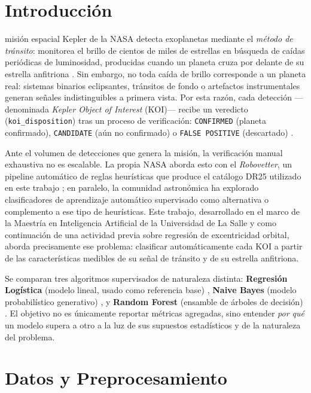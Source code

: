 \documentclass[10pt,journal]{IEEEtran}
\begin{document}
  \section{Introducci\'on}

   misi\'on espacial Kepler de la NASA detecta exoplanetas mediante el \emph{m\'etodo de tr\'ansito}: monitorea el brillo de cientos de miles de estrellas en b\'usqueda de ca\'idas peri\'odicas de luminosidad, producidas cuando un planeta cruza por delante de su estrella anfitriona \cite{borucki2010}. Sin embargo, no toda ca\'ida de brillo corresponde a un planeta real: sistemas binarios eclipsantes, tr\'ansitos de fondo o artefactos instrumentales generan se\~nales indistinguibles a primera vista. Por esta raz\'on, cada detecci\'on —denominada \emph{Kepler Object of Interest} (KOI)— recibe un veredicto (\texttt{koi\_disposition}) tras un proceso de verificaci\'on: \texttt{CONFIRMED} (planeta confirmado), \texttt{CANDIDATE} (a\'un no confirmado) o \texttt{FALSE POSITIVE} (descartado) \cite{thompson2018}.

  Ante el volumen de detecciones que genera la misi\'on, la verificaci\'on manual exhaustiva no es escalable. La propia NASA aborda esto con el \emph{Robovetter}, un pipeline autom\'atico de reglas heur\'isticas que produce el cat\'alogo DR25 utilizado en este trabajo \cite{thompson2018}; en paralelo, la comunidad astron\'omica ha explorado clasificadores de aprendizaje autom\'atico supervisado como alternativa o complemento a ese tipo de heur\'isticas. Este trabajo, desarrollado en el marco de la Maestr\'ia en Inteligencia Artificial de la Universidad de La Salle y como continuaci\'on de una actividad previa sobre regresi\'on de excentricidad orbital, aborda precisamente ese problema: clasificar autom\'aticamente cada KOI a partir de las caracter\'isticas medibles de su se\~nal de tr\'ansito y de su estrella anfitriona.

  Se comparan tres algoritmos supervisados de naturaleza distinta: \textbf{Regresi\'on Log\'istica} (modelo lineal, usado como referencia base) \cite{cox1958}, \textbf{Naive Bayes} (modelo probabil\'istico generativo) \cite{rish2001}, y \textbf{Random Forest} (ensamble de \'arboles de decisi\'on) \cite{breiman2001}. El objetivo no es \'unicamente reportar m\'etricas agregadas, sino entender \emph{por qu\'e} un modelo supera a otro a la luz de sus supuestos estad\'isticos y de la naturaleza del problema.

  \section{Datos y Preprocesamiento}
\end{document}
